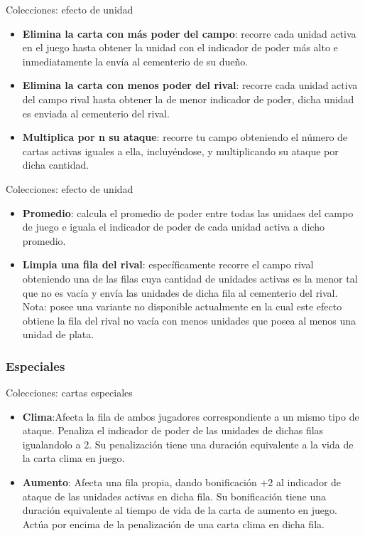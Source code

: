 \documentclass[a4paper, 12pt]{beamer}
\begin{document}
\begin{frame}{\textcolor{plata}{Colecciones: efecto de unidad}}

\begin{itemize}
\item \textbf{Elimina la carta con más poder del campo}: recorre cada unidad activa en el juego hasta obtener la unidad con el indicador de poder más alto e inmediatamente la envía al cementerio de su dueño.
\item \textbf{Elimina la carta con menos poder del rival}: recorre cada unidad activa del campo rival hasta obtener la de menor indicador de poder, dicha unidad es enviada al cementerio del rival.
\item \textbf{Multiplica por n su ataque}: recorre tu campo obteniendo el número de cartas activas iguales a ella, incluyéndose, y multiplicando su ataque por dicha cantidad.
\end{itemize}

\end{frame}

\begin{frame}{\textcolor{plata}{Colecciones: efecto de unidad}}

\begin{itemize}
\item \textbf{Promedio}: calcula el promedio de poder entre todas las unidaes del campo de juego e iguala el indicador de poder de cada unidad activa a dicho promedio. 
\item \textbf{Limpia una fila del rival}: específicamente recorre el campo rival obteniendo una de las filas cuya cantidad de unidades activas es la menor tal que no es vacía y envía las unidades de dicha fila al cementerio del rival. Nota: posee una variante no disponible actualmente en la cual este efecto obtiene la fila del rival no vacía con menos unidades que posea al menos una unidad de plata.
\end{itemize}

\end{frame}

\subsubsection{Especiales}
\begin{frame}{\textcolor{plata}{Colecciones: cartas especiales}}
\begin{itemize}
\item \textbf{Clima}:Afecta la fila de ambos jugadores correspondiente a un mismo tipo de ataque. Penaliza el indicador de poder de las unidades de dichas filas igualandolo a 2. Su penalización tiene una duración equivalente a la vida de la carta clima en juego.
\item \textbf{Aumento}: Afecta una fila propia, dando bonificación +2 al indicador de ataque de las unidades activas en dicha fila. Su bonificación tiene una duración equivalente al tiempo de vida de la carta de aumento en juego. Actúa por encima de la penalización de una carta clima en dicha fila.
\end{itemize}
\end{frame}
\end{document}

